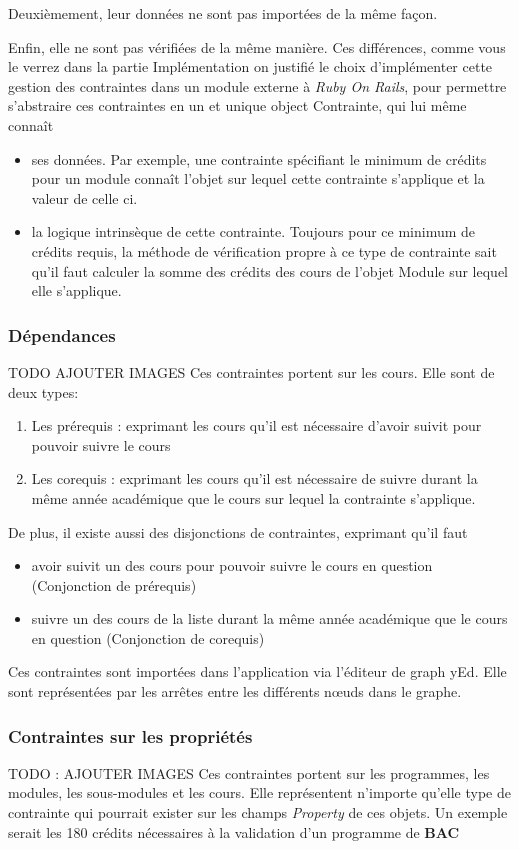 Deuxièmement, leur données ne sont pas importées de la même façon. 

Enfin, elle ne sont pas vérifiées de la même manière. Ces différences, comme vous le verrez dans la partie Implémentation on justifié le choix d'implémenter cette gestion des contraintes dans un module externe à \textit{Ruby On Rails}, pour permettre s'abstraire ces contraintes en un et unique object Contrainte, qui lui même connaît
\begin{itemize}
\item ses données. Par exemple, une contrainte spécifiant le minimum de crédits pour un module connaît l'objet sur lequel cette contrainte s'applique et la valeur de celle ci.
\item la logique intrinsèque de cette contrainte. Toujours pour ce minimum de crédits requis, la méthode de vérification propre à ce type de contrainte sait qu'il faut calculer la somme des crédits des cours de l'objet Module sur lequel elle s'applique. 
\end{itemize}    
\subsubsection{Dépendances}
TODO AJOUTER IMAGES
Ces contraintes portent sur les cours. 
Elle sont de deux types:
\begin{enumerate}
\item Les prérequis : exprimant les cours qu'il est nécessaire d'avoir suivit pour pouvoir suivre le cours
\item Les corequis : exprimant les cours qu'il est nécessaire de suivre durant la même année académique que le cours sur lequel la contrainte s'applique. 
\end{enumerate}

De plus, il existe aussi des disjonctions de contraintes, exprimant qu'il faut
\begin{itemize}
\item avoir suivit un des cours pour pouvoir suivre le cours en question (Conjonction de prérequis)
\item suivre un des cours de la liste durant la même année académique que le cours en question (Conjonction de corequis)
\end{itemize}

Ces contraintes sont importées dans l'application via l'éditeur de graph yEd. Elle sont représentées par les arrêtes entre les différents nœuds dans le graphe. 
\subsubsection{Contraintes sur les propriétés}
TODO : AJOUTER IMAGES
Ces contraintes portent sur les programmes, les modules, les sous-modules et les cours. Elle représentent n'importe qu'elle type de contrainte qui pourrait exister sur les champs \textit{Property} de ces objets. Un exemple serait les 180 crédits nécessaires à la validation d'un programme de \textbf{BAC}

